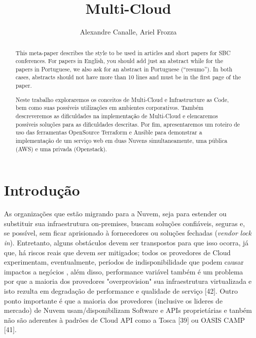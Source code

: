 \documentclass[12pt]{article}
\title{Multi-Cloud}
\author{Alexandre Canalle\inst{1}, Ariel Frozza\inst{1}}
\begin{document}

\singlespacing

\maketitle
	
\begin{abstract}
	This meta-paper describes the style to be used in articles and short papers
	for SBC conferences. For papers in English, you should add just an abstract
	while for the papers in Portuguese, we also ask for an abstract in
	Portuguese (``resumo''). In both cases, abstracts should not have more than
	10 lines and must be in the first page of the paper.
\end{abstract}

\begin{abstract} 
	Neste trabalho exploraremos os conceitos de Multi-Cloud e Infrastructure as Code, bem como suas possíveis utilizações em ambientes corporativos. Também descreveremos as dificuldades na implementação de Multi-Cloud e elencaremos possíveis soluções para as dificuldades descritas.  Por fim, apresentaremos um roteiro de uso das ferramentas OpenSource Terraform e Ansible para demonstrar a implementação de um serviço web em duas Nuvens simultaneamente, uma pública (AWS) e uma privada (Openstack).
\end{abstract}

	\section{Introdução}
		As organizações que estão migrando para a Nuvem, seja para estender ou substituir sua infraestrutura on-premises, buscam soluções confiáveis, seguras e, se possível, sem ficar aprisionado à fornecedores ou soluções fechadas (\textit{vendor lock in}). Entretanto, alguns obstáculos devem ser transpostos para que isso ocorra, já que, há riscos reais que devem ser mitigados; todos os provedores de Cloud experimentam, eventualmente, períodos de indisponibilidade que podem causar impactos a negócios \cite{
		1}, além disso,  performance variável também é um problema por que a maioria dos provedores "overprovision" sua infraestrutura virtualizada e isto rezulta em degradação de performance e qualidade de serviço [42]. Outro ponto importante é que a maioria dos provedores (inclusive os lideres de mercado) de Nuvem usam/disponibilizam Software e APIs proprietárias e tanbém não são aderentes à padrões de Cloud API como a Tosca [39] ou OASIS CAMP [41].
		
\end{document}
